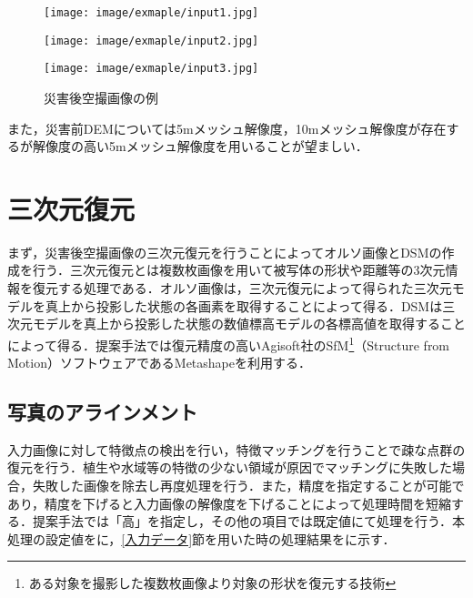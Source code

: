     \begin{figure}[t]
      \begin{minipage}[c]{0.329\hsize}
        \centering
        \texttt{[image: image/exmaple/input1.jpg]}
        \label{入力画像例1}
      \end{minipage}
      \begin{minipage}[c]{0.329\hsize}
        \centering
        \texttt{[image: image/exmaple/input2.jpg]}
        \label{入力画像例2}
      \end{minipage}
      \begin{minipage}[c]{0.329\hsize}
        \centering
        \texttt{[image: image/exmaple/input3.jpg]}
        \label{入力画像例3}
      \end{minipage}
      \caption{災害後空撮画像の例}
      \label{空撮画像例}
    \end{figure}

    また，災害前DEMについては5mメッシュ解像度，10mメッシュ解像度が存在するが解像度の高い5mメッシュ解像度を用いることが望ましい．



  \section{三次元復元}
    まず，災害後空撮画像の三次元復元を行うことによってオルソ画像とDSMの作成を行う．三次元復元とは複数枚画像を用いて被写体の形状や距離等の3次元情報を復元する処理である．オルソ画像は，三次元復元によって得られた三次元モデルを真上から投影した状態の各画素を取得することによって得る．DSMは三次元モデルを真上から投影した状態の数値標高モデルの各標高値を取得することによって得る．提案手法では復元精度の高いAgisoft社のSfM\footnote{ある対象を撮影した複数枚画像より対象の形状を復元する技術}（Structure from Motion）ソフトウェアであるMetashape\cite{Metashape}を利用する．


    \subsection{写真のアラインメント}
      \label{写真のアラインメント}
      入力画像に対して特徴点の検出を行い，特徴マッチングを行うことで疎な点群の復元を行う．植生や水域等の特徴の少ない領域が原因でマッチングに失敗した場合，失敗した画像を除去し再度処理を行う．また，精度を指定することが可能であり，精度を下げると入力画像の解像度を下げることによって処理時間を短縮する．提案手法では「高」を指定し，その他の項目では既定値にて処理を行う．本処理の設定値をに，\ref{入力データ}節を用いた時の処理結果をに示す．

